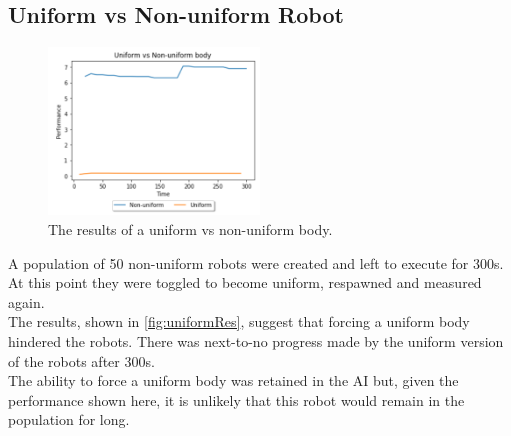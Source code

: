 \documentclass{article}
\begin{document}
\subsection{Uniform vs Non-uniform Robot}
\label{sec:Uniform Res}
\begin{figure}
    \centering
    \vspace*{-5mm}
    \includegraphics[width=0.5\textwidth]{uniformResults}
    \vspace*{-7mm}
    \caption{The results of a uniform vs non-uniform body.}
    \label{fig:uniformRes}
\end{figure}
A population of 50 non-uniform robots were created and left to execute for 300s. At this point they were toggled to become uniform, respawned and measured again. \\
The results, shown in \autoref{fig:uniformRes}, suggest that forcing a uniform body hindered the robots. There was next-to-no progress made by the uniform version of the robots after 300s. \\
The ability to force a uniform body was retained in the AI but, given the performance shown here, it is unlikely that this robot would remain in the population for long.
\\[2\baselineskip]
\end{document}

